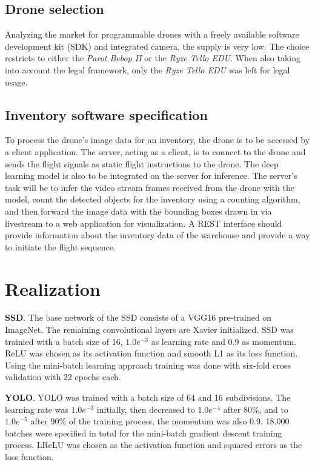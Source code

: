 \documentclass[a4paper, 10pt, journal]{wissarbIEEE}      %
\begin{document}
\subsection{Drone selection}

Analyzing the market for programmable drones with a freely available software development kit (SDK) and integrated camera, the supply is very low. The choice restricts to either the \textit{Parot Bebop II} or the \textit{Ryze Tello EDU}. When also taking into account the legal framework, only the \textit{Ryze Tello EDU} was left for legal usage.

\subsection{Inventory software specification}

To process the drone's image data for an inventory, the drone is to be accessed by a client application. The server, acting as a client, is to connect to the drone and sends the flight signals as static flight instructions to the drone. The deep learning model is also to be integrated on the server for inference. The server's task will be to infer the video stream frames received from the drone with the model, count the detected objects for the inventory using a counting algorithm, and then forward the image data with the bounding boxes drawn in via livestream to a web application for visualization. A REST interface should provide information about the inventory data of the warehouse and provide a way to initiate the flight sequence.

\section{Realization} \label{realization}

\textbf{SSD}. The base network of the SSD consists of a VGG16 pre-trained on ImageNet. The remaining convolutional layers are Xavier initialized. SSD was trainied with a batch size of 16, $1.0e^{-3}$ as learning rate and 0.9 as momentum. ReLU was chosen as its activation function and smooth L1 as its loss function. Using the mini-batch learning approach training was done with six-fold cross validation with 22 epochs each.

\textbf{YOLO}. YOLO was trained with a batch size of 64 and 16 subdivisions. The learning rate was $1.0e^{-3}$ initially, then decreased to $1.0e^{-4}$ after 80\%, and to $1.0e^{-5}$ after 90\% of the training process, the momentum was also 0.9. 18.000 batches were specified in total for the mini-batch gradient descent training process. LReLU was chosen as the activation function and squared errors as the loss function.
\end{document}
